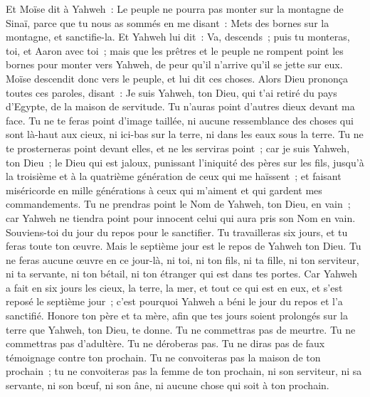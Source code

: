 \begin{multicols}{2}
 Et Moïse dit à Yahweh~: Le peuple ne pourra pas monter sur la montagne de Sinaï, parce que tu nous as sommés en me disant~: Mets des bornes sur la montagne, et sanctifie-la.
Et Yahweh lui dit~: Va, descends~; puis tu monteras, toi, et Aaron avec toi~; mais que les prêtres et le peuple ne rompent point les bornes pour monter vers Yahweh, de peur qu'il n'arrive qu'il se jette sur eux.
Moïse descendit donc vers le peuple, et lui dit ces choses.
\VerseOne{}Alors Dieu prononça toutes ces paroles, disant~:
Je suis Yahweh, ton Dieu, qui t'ai retiré du pays d'Egypte, de la maison de servitude.
Tu n'auras point d'autres dieux devant ma face.
Tu ne te feras point d'image taillée, ni aucune ressemblance des choses qui sont là-haut aux cieux, ni ici-bas sur la terre, ni dans les eaux sous la terre.
Tu ne te prosterneras point devant elles, et ne les serviras point~; car je suis Yahweh, ton Dieu~; le Dieu qui est jaloux, punissant l'iniquité des pères sur les fils, jusqu'à la troisième et à la quatrième génération de ceux qui me haïssent~;
et faisant miséricorde en mille générations à ceux qui m'aiment et qui gardent mes commandements.
Tu ne prendras point le Nom de Yahweh, ton Dieu, en vain~; car Yahweh ne tiendra point pour innocent celui qui aura pris son Nom en vain.
Souviens-toi du jour du repos pour le sanctifier.
Tu travailleras six jours, et tu feras toute ton œuvre.
Mais le septième jour est le repos de Yahweh ton Dieu. Tu ne feras aucune œuvre en ce jour-là, ni toi, ni ton fils, ni ta fille, ni ton serviteur, ni ta servante, ni ton bétail, ni ton étranger qui est dans tes portes.
Car Yahweh a fait en six jours les cieux, la terre, la mer, et tout ce qui est en eux, et s'est reposé le septième jour~; c'est pourquoi Yahweh a béni le jour du repos et l'a sanctifié.
Honore ton père et ta mère, afin que tes jours soient prolongés sur la terre que Yahweh, ton Dieu, te donne.
Tu ne commettras pas de meurtre.
Tu ne commettras pas d'adultère.
Tu ne déroberas pas.
Tu ne diras pas de faux témoignage contre ton prochain.
Tu ne convoiteras pas la maison de ton prochain~; tu ne convoiteras pas la femme de ton prochain, ni son serviteur, ni sa servante, ni son bœuf, ni son âne, ni aucune chose qui soit à ton prochain.

\end{multicols}
